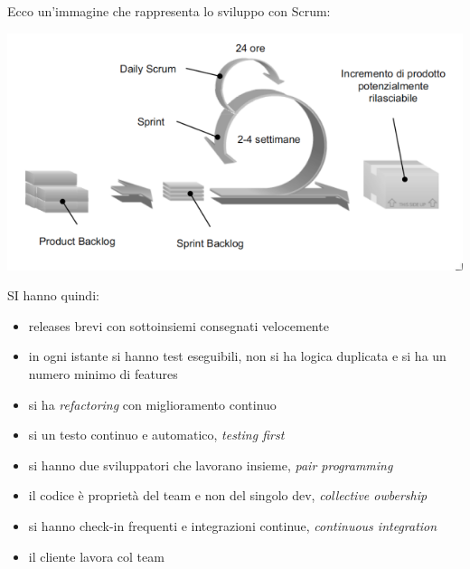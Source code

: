 \documentclass[a4paper,12pt, oneside]{book}
\begin{document}
Ecco un'immagine che rappresenta lo sviluppo con Scrum:
\begin{center}
\includegraphics[scale=0.7]{img/ms11.png}
\end{center}
SI hanno quindi:
\begin{itemize}
\item releases brevi con sottoinsiemi consegnati velocemente
\item in ogni istante si hanno test eseguibili, non si ha logica duplicata e si ha un numero minimo di features
\item si ha \textit{refactoring }con miglioramento continuo
\item si un testo continuo e automatico, \textit{testing first}
\item si hanno due sviluppatori che lavorano insieme, \textit{pair programming}
\item il codice è proprietà del team e non del singolo dev, \textit{collective owbership}
\item si hanno check-in frequenti e integrazioni continue, \textit{continuous integration}
\item il cliente lavora col team
\end{itemize}
\end{document}
